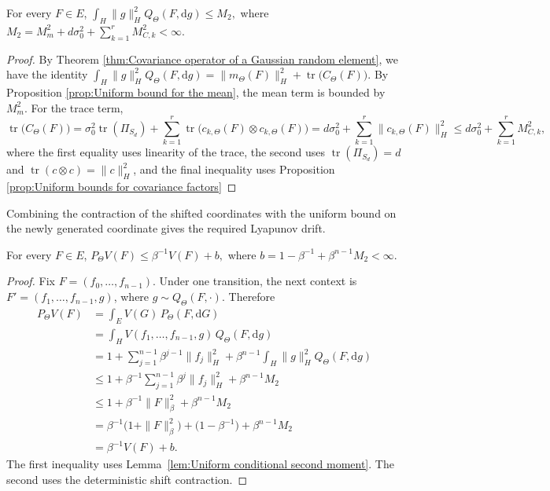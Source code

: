 \begin{lemma}\label{lem:Uniform conditional second moment}
For every \(F\in E\),
\(
\int_H\|g\|_H^2Q_\Theta(F,\mathrm dg)
\leqslant M_2,
\)
where
\(
M_2=M_m^2+d\sigma_0^2+\sum_{k=1}^rM_{C,k}^2<\infty.
\)
\end{lemma}

\begin{proof}
By Theorem \ref{thm:Covariance operator of a Gaussian random element}, we have the identity \(
\int_H\|g\|_H^2Q_\Theta(F,\mathrm dg)
=\|m_\Theta(F)\|_H^2+\operatorname{tr}\bigl(C_\Theta(F)\bigr).
\)
By Proposition \ref{prop:Uniform bound for the mean}, the mean term is bounded by \(M_m^2\). For the trace term,
\[
\operatorname{tr}\bigl(C_\Theta(F)\bigr)
=\sigma_0^2\operatorname{tr}(\Pi_{S_d})+\sum_{k=1}^r\operatorname{tr}\!\bigl(c_{k,\Theta}(F)\otimes c_{k,\Theta}(F)\bigr)
=d\sigma_0^2+\sum_{k=1}^r\|c_{k,\Theta}(F)\|_H^2
\leqslant d\sigma_0^2+\sum_{k=1}^rM_{C,k}^2,
\]
where the first equality uses linearity of the trace, the second uses \(\operatorname{tr}(\Pi_{S_d})=d\) and \(\operatorname{tr}(c\otimes c)=\|c\|_H^2\), and the final inequality uses Proposition \ref{prop:Uniform bounds for covariance factors}
\end{proof}

Combining the contraction of the shifted coordinates with the uniform bound on the newly generated coordinate gives the required Lyapunov drift.

\begin{proposition}\label{prop:Geometric Foster--Lyapunov drift}
For every \(F\in E\), \(P_\Theta V(F)\leqslant\beta^{-1}V(F)+b,
\)
where
\(
b=1-\beta^{-1}+\beta^{n-1}M_2<\infty.
\)
\end{proposition}

\begin{proof}
Fix \(F=(f_0,\ldots,f_{n-1})\). Under one transition, the next context is
\(
F'=(f_1,\ldots,f_{n-1},g)\),
where
\(
g\sim Q_\Theta(F,\cdot).
\)
Therefore
\[
\begin{aligned}
P_\Theta V(F)
&=
\int_E V(G)\,P_\Theta(F,\mathrm dG)\\
&=
\int_H V(f_1,\ldots,f_{n-1},g)\,Q_\Theta(F,\mathrm dg)\\
&=1+\sum_{j=1}^{n-1}\beta^{j-1}\|f_j\|_H^2
+\beta^{n-1}\int_H\|g\|_H^2Q_\Theta(F,\mathrm dg)\\
&\leqslant1+\beta^{-1}\sum_{j=1}^{n-1}\beta^j\|f_j\|_H^2
+\beta^{n-1}M_2\\
&\leqslant1+\beta^{-1}\|F\|_\beta^2+\beta^{n-1}M_2\\
&=\beta^{-1}\bigl(1+\|F\|_\beta^2\bigr)
+\bigl(1-\beta^{-1}\bigr)+\beta^{n-1}M_2\\
&=\beta^{-1}V(F)+b.
\end{aligned}
\]
The first inequality uses Lemma~\ref{lem:Uniform conditional second moment}. The second uses the deterministic shift contraction.
\end{proof}

